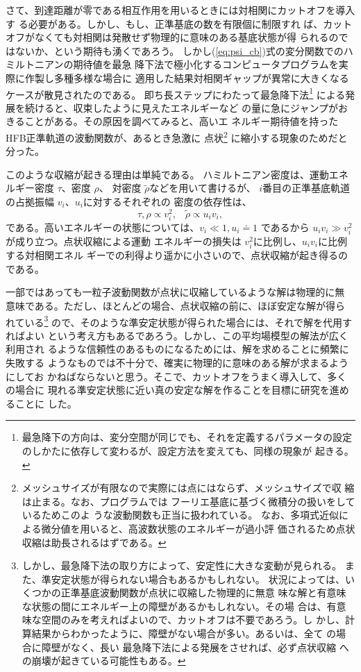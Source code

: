 さて、到達距離が零である相互作用を用いるときには対相関にカットオフを導入す
る必要がある\cite{TOT94}。しかし、もし、正準基底の数を有限個に制限すれ
ば、カットオフがなくても対相関は発散せず物理的に意味のある基底状態が得
られるのではないか、という期待も湧くであろう。
しかし(\ref{eq:psi_cb})式の変分関数でのハミルトニアンの期待値を最急
降下法で極小化するコンピュータプログラムを実際に作製し多種多様な場合に
適用した結果対相関ギャップが異常に大きくなるケースが散見されたのである。
即ち長ステップにわたって最急降下法\footnote{
%
最急降下の方向は、変分空間が同じでも、それを定義するパラメータの設定
のしかたに依存して変わるが、設定方法を変えても、同様の現象が
起きる。
%
}
による発展を続けると、収束したように見えたエネルギーなど
の量に急にジャンプがおきることがある。その原因を調べてみると、高いエ
ネルギー期待値を持ったHFB正準軌道の波動関数が、あるとき急激に
点状\footnote{
%
メッシュサイズが有限なので実際には点にはならず、メッシュサイズで収
縮は止まる。なお、プログラムでは
フーリエ基底に基づく微積分の扱いをしているためこのよ
うな波動関数も正当に扱われている。
なお、多項式近似による微分値を用いると、高波数状態のエネルギーが過小評
価されるため点状収縮は助長されるはずである。
%
}
に縮小する現象のためだと分った。

このような収縮が起きる理由は単純である。
ハミルトニアン密度は、運動エネルギー密度 $\tau$、密度 $\rho$、
対密度 $\tilde{\rho}$などを用いて書けるが、
$i$番目の正準基底軌道の占拠振幅 $v_i$、$u_i$に対するそれぞれの
密度の依存性は、
%
\begin{equation}
\tau, \rho \propto v_i^2, 
\;\;\;
\tilde{\rho} \propto u_i v_i,
\end{equation}
%
である。高いエネルギーの状態については、$v_i \ll 1, u_i \doteq 1$
であるから $u_i v_i \gg v_i^2$ が成り立つ。点状収縮による運動
エネルギーの損失は $v_i^2$に比例し、$u_i v_i$に比例する対相関エネル
ギーでの利得より遥かに小さいので、点状収縮が起き得るのである。

一部ではあっても一粒子波動関数が点状に収縮しているような解は物理的に無
意味である。ただし、ほとんどの場合、点状収縮の前に、ほぼ安定な解が得ら
れている\footnote{
%
しかし、最急降下法の取り方によって、安定性に大きな変動が見られる。
また、準安定状態が得られない場合もあるかもしれない。
状況によっては、いくつかの正準基底波動関数が点状に収縮した物理的に無意
味な解と有意味な状態の間にエネルギー上の障壁があるかもしれない。その場
合は、有意味な空間のみを考えればよいので、カットオフは不要であろう。し
かし、計算結果からわかったように、障壁がない場合が多い。あるいは、全て
の場合に障壁がなく、長い 最急降下法による発展をさせれば、必ず点状収縮
への崩壊が起きている可能性もある。
%
}
ので、そのような準安定状態が得られた場合には、それで解を代用すればよい
という考え方もあるであろう。しかし、この平均場模型の解法が広く利用され
るような信頼性のあるものになるためには、解を求めることに頻繁に失敗する
ようなものでは不十分で、確実に物理的に意味のある解が求まるようにしてお
かねばならないと思う。そこで、カットオフをうまく導入して、多くの場合に
現れる準安定状態に近い真の安定な解を作ることを目標に研究を進めることに
した。

